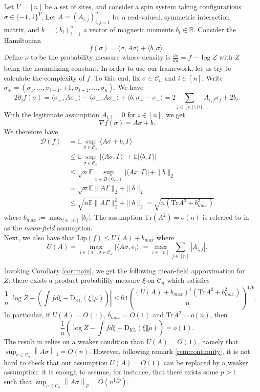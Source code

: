 \documentclass[12pt]{article}
\def \RR {\mathbb R}
\def \EE {\mathbb E}
\def \Lip {\mathrm {Lip}}
\def \tr {\mathrm{Tr}}
\def \DC {\mathcal{C}_n}
\def \KL {\mathrm{D}_{\mathrm{KL}}}
\def \Comp { \mathcal{D} }
\theoremstyle{definition}
\theoremstyle{remark}
\begin{document}
Let $V=[n]$ be a set of sites, and consider a spin system taking configurations $\sigma \in \{-1,1\}^V$. Let $A= \left (A_{i,j} \right )_{i,j=1}^n$ be a real-valued, symmetric interaction matrix, and $b = (b_i)_{i=1}^n$ a vector of magnetic moments $b_i \in \RR$. Consider the Hamiltonian
$$
f(\sigma) = \langle \sigma, A \sigma \rangle + \langle b, \sigma \rangle.
$$
Define $\nu$ to be the probability measure whose density is $\frac{d \nu}{d \mu} = f - \log Z$ with $Z$ being the normalizing constant. In order to use our framework, let us try to calculate the complexity of $f$. To this end, fix $\sigma \in \DC$ and $i \in [n]$. Write $\sigma_\pm = (\sigma_1,\dots,\sigma_{i-1},\pm 1,\sigma_{i+1},\dots,\sigma_n)$. We have
$$
2\partial_i f(\sigma) = \langle \sigma_+, A \sigma_+ \rangle -  \langle \sigma_-, A \sigma_- \rangle + \langle b, \sigma_+ - \sigma_- \rangle = 2 \sum_{j \in [n] \setminus \{i\}} A_{i,j} \sigma_j + 2 b_i.
$$
With the legitimate assumption $A_{i,i} = 0$ for $i \in [n]$, we get
$$
\nabla f(\sigma) = A \sigma + b.
$$
We therefore have
\begin{align*}
\Comp(f) ~& = \EE \sup_{\sigma \in \DC} \langle A \sigma + b, \Gamma \rangle \\
~& \leq \EE \sup_{\sigma \in \DC} |\langle A \sigma, \Gamma \rangle| + \EE |\langle b, \Gamma \rangle | \\
~& \leq \sqrt{n} \EE \sup_{x \in B(0,1)} |\langle A x, \Gamma \rangle| + \|b \|_2 \\
~& = \sqrt{n} \EE \|A \Gamma\|_2 + \|b \|_2  \\
~& \leq \sqrt{n \EE \| A \Gamma \|_2^2} + \|b \|_2 = \sqrt{n \left (\tr A^2 + b_{max}^2 \right ) } 
\end{align*}
where $b_{max} := \max_{i \in [n]} |b_i|$. The assumption $\tr(A^2) = o(n)$ is referred to in \cite{BM16} as the \emph{mean-field} assumption. \\
Next, we also have that $\Lip(f) \leq U(A) + b_{max}$ where
$$
U(A) = \max_{i \in [n], \sigma \in \DC} |\langle A \sigma, e_i \rangle| = \max_{i \in [n]} \sum_{j \in [n]} |A_{i,j}|.
$$

Invoking Corollary \ref{cor:main}, we get the following mean-field approximation for $Z$: there exists a product probability measure $\xi$ on $\DC$ which satisfies
$$
\frac{1}{n} \left |\log Z - \left (\int f d \xi - \KL(\xi \Vert \mu) \right ) \right | \leq 64 \left ( \frac{ \left ( U(A) + b_{max} \right )^{4} \left (\tr A^2 + b_{max}^2 \right )}{n} \right )^{1/6}.
$$
In particular, if $U(A) = O(1)$, $b_{max} = O(1)$ and $\tr A^2 = o(n)$, then
$$
\frac{1}{n} \left (\log Z - \int f d \xi + \KL(\xi \Vert \mu) \right ) = o(1).
$$
The result in \cite{BM16} relies on a weaker condition than $U(A) = O(1)$, namely that $\sup_{\sigma \in \DC} \left \| A \sigma \right \|_1 = O(n)$. However, following remark \ref{rem:continuity}, it is not hard to check that our assumption $U(A) = O(1)$ can be replaced by a weaker assumption: it is enough to assume, for instance, that there exists some $p>1$ such that  $\sup_{\sigma \in \DC} \left \| A \sigma \right \|_p = O(n^{1/p})$.
\end{document}
